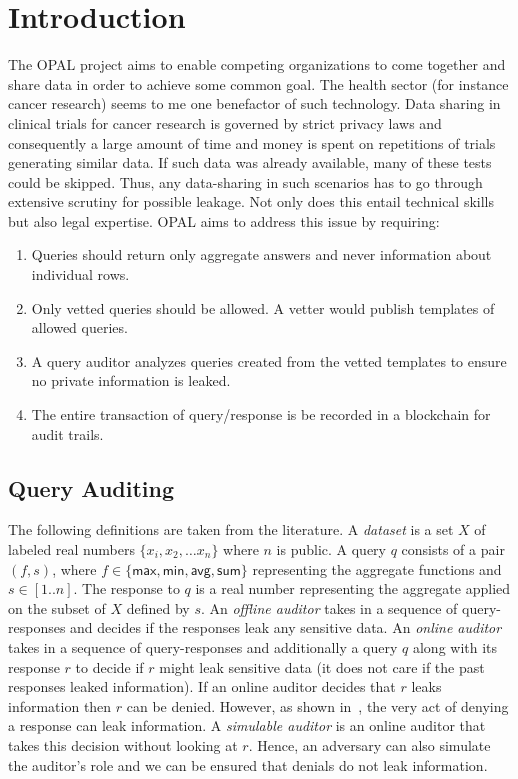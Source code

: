 \section{Introduction}

The OPAL project aims to enable competing organizations to come together and share data in order to achieve some common goal. The health sector (for instance cancer research) seems to me one benefactor of such technology. Data sharing in clinical trials for cancer research is governed by strict privacy laws and consequently a large amount of time and money is spent on repetitions of trials generating similar data. If such data was already available, many of these tests could be skipped. Thus, any data-sharing in such scenarios has to go through extensive scrutiny for possible leakage. Not only does this entail technical skills but also legal expertise. OPAL aims to address this issue by requiring:
\begin{enumerate}
	\item Queries should return only aggregate answers and never information about individual rows.
	\item Only vetted queries should be allowed. A vetter would publish templates of allowed queries.
	\item A query auditor analyzes queries created from the vetted templates to ensure no private information is leaked.
	\item The entire transaction of query/response is be recorded in a blockchain for audit trails.
\end{enumerate}

\subsection{Query Auditing}
The following definitions are taken from the literature. A {\em dataset} is a set $X$ of labeled real numbers $\{x_i, x_2,\ldots x_n\}$ where $n$ is public. 
A query $q$ consists of a pair $(f, s)$, where $f\in \{\textsf{max}, \textsf{min}, \textsf{avg}, \textsf{sum}\}$ representing the aggregate functions and $s\in[1..n]$. 
The response to $q$ is a real number representing the aggregate applied on the subset of $X$ defined by $s$. An {\em offline auditor} takes in a sequence of query-responses and decides if the responses leak any sensitive data. An {\em online auditor} takes in a sequence of query-responses and additionally a query $q$ along with its response $r$ to decide if $r$ might leak sensitive data (it does not care if the past responses leaked information). If an online auditor decides that $r$ leaks information then $r$ can be denied. However, as shown in~\cite{auditor}, the very act of denying a response can leak information. A {\em simulable auditor} is an online auditor that takes this decision without looking at $r$. Hence, an adversary can also simulate the auditor's role and we can be ensured that denials do not leak information. 

